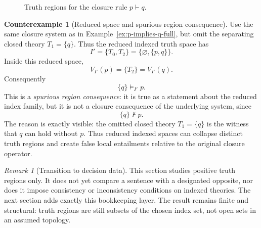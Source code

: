 \documentclass[11pt]{amsart}
\numberwithin{equation}{section}
\theoremstyle{plain}
\theoremstyle{definition}
\newtheorem{counterexample}[theorem]{Counterexample}
\theoremstyle{remark}
\newtheorem{remark}[theorem]{Remark}
\begin{document}
\begin{figure}[!htbp]
\centering
{}
\caption{Truth regions for the closure rule \(p\vdash q\).}
\label{fig:full-truth-region-pq}
\end{figure}

\begin{counterexample}[Reduced space and spurious region consequence]
\label{cex:reduced-index-spurious-region-consequence}
Use the same closure system as in Example~\ref{ex:p-implies-q-full}, but omit the separating closed theory \(T_1=\{q\}\).  Thus the reduced indexed truth space has
\[
  I'=\{T_0,T_2\}=\{\varnothing,\{p,q\}\}.
\]
Inside this reduced space,
\[
  V_{I'}(p)=\{T_2\}=V_{I'}(q).
\]
Consequently
\[
  \{q\}\models_{I'}p.
\]
This is a \emph{spurious region consequence}: it is true as a statement about the reduced index family, but it is not a closure consequence of the underlying system, since
\[
  \{q\}\nvdash p.
\]
The reason is exactly visible: the omitted closed theory \(T_1=\{q\}\) is the witness that \(q\) can hold without \(p\).  Thus reduced indexed spaces can collapse distinct truth regions and create false local entailments relative to the original closure operator.
\end{counterexample}

\begin{remark}[Transition to decision data]
This section studies positive truth regions only.  It does not yet compare a sentence with a designated opposite, nor does it impose consistency or inconsistency conditions on indexed theories.  The next section adds exactly this bookkeeping layer.  The result remains finite and structural: truth regions are still subsets of the chosen index set, not open sets in an assumed topology.
\end{remark}
\end{document}
